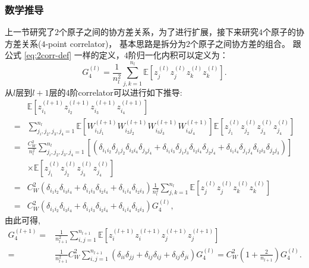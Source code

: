 \subsubsection{数学推导}
上一节研究了$2$个原子之间的协方差关系，为了进行扩展，接下来研究$4$个原子的协方差关系($4$-point correlator)，
基本思路是拆分为$2$个原子之间协方差的组合。
跟公式 \ref{eq:2corr-def} 一样的定义，$4$阶归一化内积可以定义为：
\begin{equation}
    G_4^{(l)} = \frac{1}{n_l^2} \sum_{j,k=1}^{n_l} 
        \mathbb{E}[z_j^{(l)}z_j^{(l)}z_k^{(l)}z_k^{(l)}].
\end{equation}
从$l$层到$l+1$层的$4$阶correlator可以进行如下推导:
\begin{equation}
    \begin{aligned}
        & \mathbb{E}[z_{i_1}^{(l+1)}z_{i_2}^{(l+1)}z_{i_3}^{(l+1)}z_{i_4}^{(l+1)}] \\
        =& \sum_{j_i,j_2,j_3,j_4=1}^{n_l} 
            \mathbb{E}[W_{i_1j_1}^{(l+1)}W_{i_2j_2}^{(l+1)} W_{i_3j_3}^{(l+1)}W_{i_4j_4}^{(l+1)}] 
            \mathbb{E}[z_{j_1}^{(l)}z_{j_2}^{(l)} z_{j_3}^{(l)}z_{j_4}^{(l)}] \\
        =& \frac{C_W^2}{n_l^2} \sum_{j_i,j_2,j_3,j_4=1}^{n_l} 
            [(\delta_{i_1i_2}\delta_{j_1j_2}\delta_{i_3i_4}\delta_{j_3j_4}
            +\delta_{i_1i_3}\delta_{j_1j_3}\delta_{i_2i_4}\delta_{j_2j_4}
            +\delta_{i_1i_4}\delta_{j_1j_4}\delta_{i_2i_3}\delta_{j_2j_3})] \\
        & \times \mathbb{E}[z_{j_1}^{(l)}z_{j_2}^{(l)}z_{j_3}^{(l)}z_{j_4}^{(l)}] \\
        = & C_W^2 (\delta_{i_1i_2}\delta_{i_3i_4} + \delta_{i_1i_3}\delta_{i_2i_4} 
            + \delta_{i_1i_4}\delta_{i_2i_3}) \frac{1}{n_l^2} 
            \sum_{j,k=1}^{n_l}\mathbb{E}[z_j^{(l)}z_j^{(l)}z_k^{(l)}z_k^{(l)}] \\
        = & C_W^2 (\delta_{i_1i_2}\delta_{i_3i_4} + \delta_{i_1i_3}\delta_{i_2i_4} 
            + \delta_{i_1i_4}\delta_{i_2i_3}) G_4^{(l)},
    \end{aligned}
    \label{eq:4point-recur-1}
\end{equation}
由此可得,
\begin{equation}
    \begin{aligned}
    G_4^{(l+1)} = & \frac{1}{n_{l+1}^2} \sum_{i,j=1}^{n_{l+1}}
        \mathbb{E}[z_i^{(l+1)}z_i^{(l+1)}z_j^{(l+1)}z_j^{(l+1)}] \\
        = & \frac{1}{n_{l+1}^2} C_W^2 \sum_{i,j=1}^{n_{l+1}}
            (\delta_{ii}\delta_{jj} + \delta_{ij}\delta_{ij} + \delta_{ij}\delta_{ji}) G_4^{(l)} 
        = C_W^2 (1 + \frac{2}{n_{l+1}}) G_4^{(l)}.
    \end{aligned}
\end{equation}

